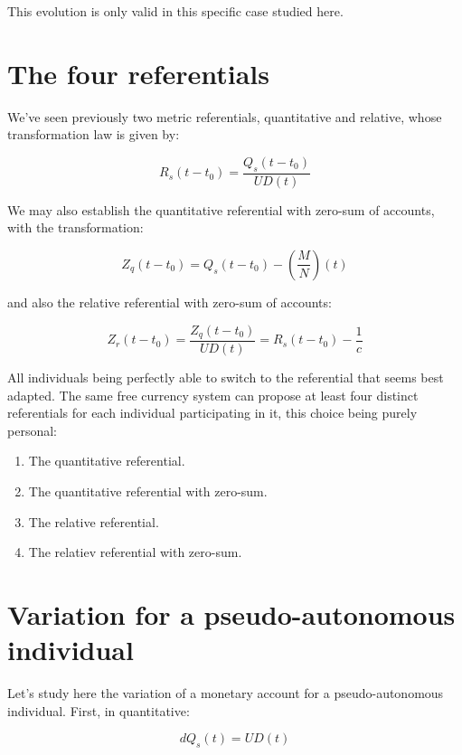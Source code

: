 \documentclass[a4paper,oneside,12pt]{article}
\begin{document}
This evolution is only valid in this specific case studied here.


\section{The four referentials}

We've seen previously two metric referentials, quantitative and
relative, whose transformation law is given by:

\begin{displaymath}R_s(t-t_{0})=\frac{Q_s(t-t_{0})}{UD(t)} \end{displaymath}

We may also establish the quantitative referential with zero-sum of
accounts, with the transformation:

\begin{displaymath}Z_q(t-t_{0})=Q_s(t-t_{0})-\left( \frac{M}{N} \right) (t) \end{displaymath}

and also the relative referential with zero-sum of accounts:

\begin{displaymath}Z_r(t-t_{0})=\frac{Z_q(t-t_{0})}{UD(t)}=R_s(t-t_{0}) - \frac{1}{c} \end{displaymath}

All individuals being perfectly able to switch to the referential that
seems best adapted.  The same free currency system can propose at
least four distinct referentials for each individual participating in
it, this choice being purely personal:

\begin{enumerate}
\item The quantitative referential.
\item The quantitative referential with zero-sum.
\item The relative referential.
\item The relatiev referential with zero-sum.
\end{enumerate}

\section{Variation for a pseudo-autonomous individual}

Let's study here the variation of a monetary account for a
pseudo-autonomous individual.  First, in quantitative:

\begin{displaymath}dQ_s(t)=UD(t) \end{displaymath}
\end{document}
